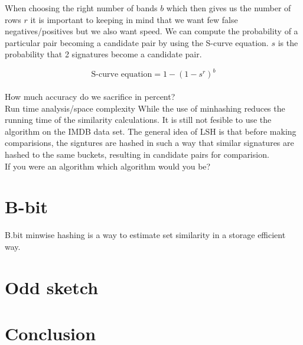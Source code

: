 \documentclass[a4paper,11pt]{article}
\begin{document}
When choosing the right number of bands $b$ which then gives us the number of rows $r$ it is important to keeping in mind that we want few false negatives/positives but we also want speed. We can compute the probability of a particular pair becoming a candidate pair by using the S-curve equation. $s$ is the probability that 2 signatures become a candidate pair.

\begin{equation}
\text {S-curve equation} = 1 - (1 - s^r)^b 
\end{equation}\\

How much accuracy do we sacrifice in percent?\\

Run time analysis/space complexity
While the use of minhashing reduces the running time of the similarity calculations. It is still not fesible to use the algorithm on the IMDB data set. The general idea of LSH is that before making comparisions, the signtures are hashed in such a way that similar signatures are hashed to the same buckets, resulting in candidate pairs for comparision.\\

If you were an algorithm which algorithm would you be?

\section{B-bit}
B.bit minwise hashing is a way to estimate set similarity in a storage efficient way.
\section{Odd sketch}

\section{Conclusion}
\end{document}
